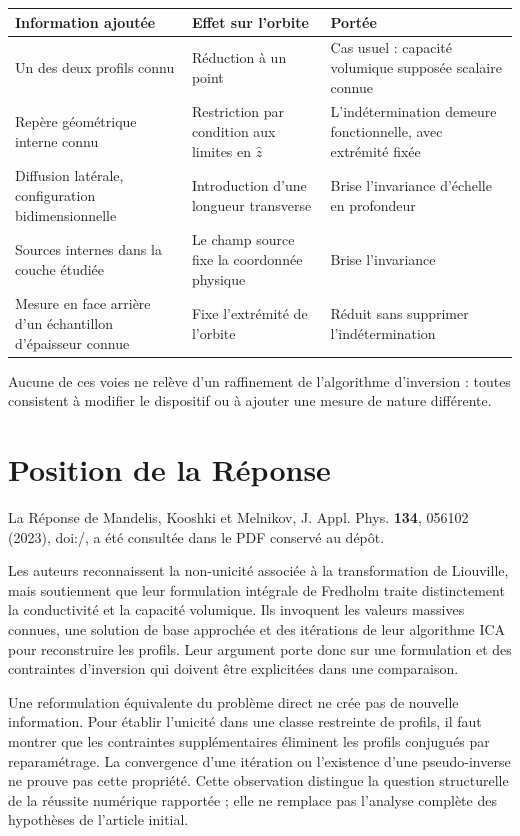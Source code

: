 \documentclass[11pt,a4paper]{article}
\begin{document}
\begin{center}
\begin{tabularx}{\textwidth}{@{}L{4.6cm}XX@{}}
\toprule
\textbf{Information ajoutée} & \textbf{Effet sur l'orbite} & \textbf{Portée} \\
\midrule
Un des deux profils connu & Réduction à un point & Cas usuel : capacité volumique supposée scalaire
connue \\
\addlinespace
Repère géométrique interne connu & Restriction par condition aux limites en $\hat z$ & L'indétermination
demeure fonctionnelle, avec extrémité fixée \\
\addlinespace
Diffusion latérale, configuration bidimensionnelle & Introduction d'une longueur transverse & Brise
l'invariance d'échelle en profondeur \\
\addlinespace
Sources internes dans la couche étudiée & Le champ source fixe la coordonnée physique & Brise
l'invariance \\
\addlinespace
Mesure en face arrière d'un échantillon d'épaisseur connue & Fixe l'extrémité de l'orbite & Réduit sans
supprimer l'indétermination \\
\bottomrule
\end{tabularx}
\end{center}

Aucune de ces voies ne relève d'un raffinement de l'algorithme d'inversion : toutes consistent à
modifier le dispositif ou à ajouter une mesure de nature différente.

\section{Position de la Réponse}
La Réponse de Mandelis, Kooshki et Melnikov, J. Appl. Phys. \textbf{134}, 056102
(2023), doi:/, a été consultée dans le PDF conservé au dépôt.

Les auteurs reconnaissent la non-unicité associée à la transformation de Liouville,
mais soutiennent que leur formulation intégrale de Fredholm traite distinctement
la conductivité et la capacité volumique. Ils invoquent les valeurs massives connues,
une solution de base approchée et des itérations de leur algorithme ICA pour reconstruire
les profils. Leur argument porte donc sur une formulation et des contraintes d'inversion
qui doivent être explicitées dans une comparaison.

Une reformulation équivalente du problème direct ne crée pas de nouvelle information.
Pour établir l'unicité dans une classe restreinte de profils, il faut montrer que
les contraintes supplémentaires éliminent les profils conjugués par reparamétrage.
La convergence d'une itération ou l'existence d'une pseudo-inverse ne prouve pas cette propriété.
Cette observation distingue la question structurelle de la réussite numérique rapportée ;
elle ne remplace pas l'analyse complète des hypothèses de l'article initial.
\end{document}
